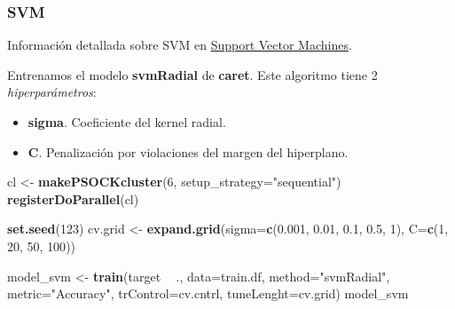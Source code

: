 \documentclass[]{article}
\newenvironment{Shaded}{\begin{snugshade}}{\end{snugshade}}
\newcommand{\DataTypeTok}[1]{\textcolor[rgb]{0.13,0.29,0.53}{#1}}
\newcommand{\DecValTok}[1]{\textcolor[rgb]{0.00,0.00,0.81}{#1}}
\newcommand{\FloatTok}[1]{\textcolor[rgb]{0.00,0.00,0.81}{#1}}
\newcommand{\KeywordTok}[1]{\textcolor[rgb]{0.13,0.29,0.53}{\textbf{#1}}}
\newcommand{\NormalTok}[1]{#1}
\newcommand{\OperatorTok}[1]{\textcolor[rgb]{0.81,0.36,0.00}{\textbf{#1}}}
\newcommand{\StringTok}[1]{\textcolor[rgb]{0.31,0.60,0.02}{#1}}
\begin{document}
\hypertarget{svm}{%
\subsubsection{SVM}\label{svm}}

Información detallada sobre SVM en
\href{https://www.cienciadedatos.net/documentos/34_maquinas_de_vector_soporte_support_vector_machines}{\color{blue}Support Vector Machines}.

Entrenamos el modelo \textbf{svmRadial} de \textbf{caret}. Este algoritmo tiene 2 \emph{hiperparámetros}:

\begin{itemize}
\item
  \textbf{sigma}. Coeficiente del kernel radial.
\item
  \textbf{C}. Penalización por violaciones del margen del hiperplano.
\end{itemize}

\vspace{3mm}

\begin{Shaded}
\begin{Highlighting}[]
\NormalTok{cl <-}\StringTok{ }\KeywordTok{makePSOCKcluster}\NormalTok{(}\DecValTok{6}\NormalTok{, }\DataTypeTok{setup_strategy=}\StringTok{"sequential"}\NormalTok{)}
\KeywordTok{registerDoParallel}\NormalTok{(cl)}
\end{Highlighting}
\end{Shaded}

\begin{Shaded}
\begin{Highlighting}[]
\KeywordTok{set.seed}\NormalTok{(}\DecValTok{123}\NormalTok{)}
\NormalTok{cv.grid <-}\StringTok{ }\KeywordTok{expand.grid}\NormalTok{(}\DataTypeTok{sigma=}\KeywordTok{c}\NormalTok{(}\FloatTok{0.001}\NormalTok{, }\FloatTok{0.01}\NormalTok{, }\FloatTok{0.1}\NormalTok{, }\FloatTok{0.5}\NormalTok{, }\DecValTok{1}\NormalTok{),}
                       \DataTypeTok{C=}\KeywordTok{c}\NormalTok{(}\DecValTok{1}\NormalTok{, }\DecValTok{20}\NormalTok{, }\DecValTok{50}\NormalTok{, }\DecValTok{100}\NormalTok{))}

\NormalTok{model_svm <-}\StringTok{ }\KeywordTok{train}\NormalTok{(target }\OperatorTok{~}\StringTok{ }\NormalTok{., }\DataTypeTok{data=}\NormalTok{train.df,}
                      \DataTypeTok{method=}\StringTok{"svmRadial"}\NormalTok{,}
                      \DataTypeTok{metric=}\StringTok{"Accuracy"}\NormalTok{,}
                      \DataTypeTok{trControl=}\NormalTok{cv.cntrl,}
                      \DataTypeTok{tuneLenght=}\NormalTok{cv.grid)}
\NormalTok{model_svm}
\end{Highlighting}
\end{Shaded}
\end{document}
